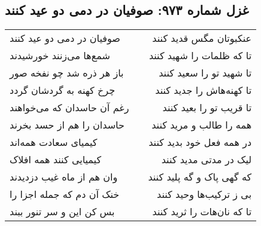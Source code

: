 \begin{center}
\section*{غزل شماره ۹۷۳: صوفیان در دمی دو عید کنند}
\label{sec:0973}
\begin{longtable}{l p{0.5cm} r}
صوفیان در دمی دو عید کنند
&&
عنکبوتان مگس قدید کنند
\\
شمع‌ها می‌زنند خورشیدند
&&
تا که ظلمات را شهید کنند
\\
باز هر ذره شد چو نفخه صور
&&
تا شهید تو را سعید کنند
\\
چرخ کهنه به گردشان گردد
&&
تا کهنه‌هاش را جدید کنند
\\
رغم آن حاسدان که می‌خواهند
&&
تا قریب تو را بعید کنند
\\
حاسدان را هم از حسد بخرند
&&
همه را طالب و مرید کنند
\\
کیمیای سعادت همه‌اند
&&
در همه فعل خود بدید کنند
\\
کیمیایی کنند همه افلاک
&&
لیک در مدتی مدید کنند
\\
وان هم از ماه غیب دزدیدند
&&
که گهی پاک و گه پلید کنند
\\
خنک آن دم که جمله اجزا را
&&
بی ز ترکیب‌ها وحید کنند
\\
بس کن این و سر تنور ببند
&&
تا که نان‌هات را ثرید کنند
\\
\end{longtable}
\end{center}
